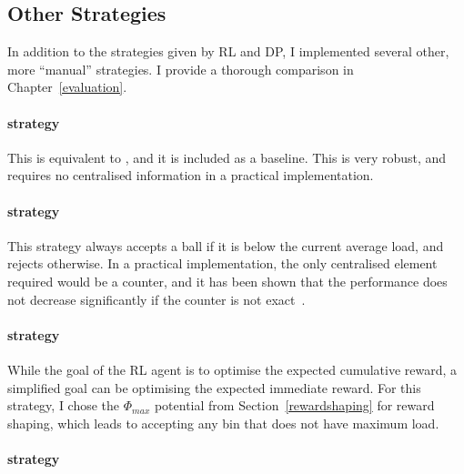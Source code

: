 \subsection{Other Strategies}

In addition to the strategies given by RL and DP, I implemented several other, more ``manual'' strategies. I provide a thorough comparison in Chapter~\ref{evaluation}.


\paragraph{\AlwaysAccept strategy}
This is equivalent to \OneChoice, and it is included as a baseline. This is very robust, and requires no centralised information in a practical implementation.


\paragraph{\MeanThinning strategy}
This strategy always accepts a ball if it is below the current average load, and rejects otherwise. In a practical implementation, the only centralised element required would be a counter, and it has been shown that the performance does not decrease significantly if the counter is not exact~\cite{los2022cachingpackingthinningtwinning}. 


\paragraph{\LocalRewardOptimiser strategy}

While the goal of the RL agent is to optimise the expected cumulative reward, a simplified goal can be optimising the expected immediate reward. For this strategy, I chose the $\Phi_{max}$ potential from Section~\ref{rewardshaping} for reward shaping, which leads to accepting any bin that does not have maximum load.


\paragraph{\Threshold strategy \protect\footnotemark[1]} 



